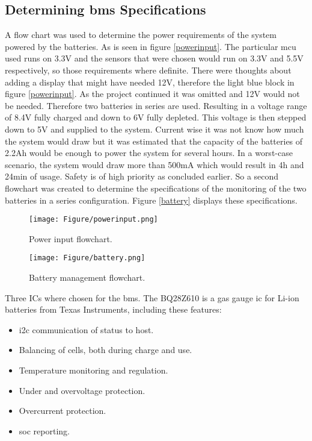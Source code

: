 \subsection{Determining \gls{bms} Specifications}

A flow chart was used to determine the power requirements of the system powered by the batteries. As is seen in figure \autoref{powerinput}. The particular \gls{mcu} used runs on 3.3V and the sensors that were chosen would run on 3.3V and 5.5V respectively, so those requirements where definite. There were thoughts about adding a display that might have needed 12V, therefore the light blue block in figure \autoref{powerinput}. As the project continued it was omitted and 12V would not be needed. Therefore two batteries in series are used. Resulting in a voltage range of 8.4V fully charged and down to 6V fully depleted. This voltage is then stepped down to 5V and supplied to the system.
Current wise it was not know how much the system would draw but it was estimated that the capacity of the batteries of 2.2Ah would be enough to power the system for several hours.
In a worst-case scenario, the system would draw more than 500mA which would result in 4h and 24min of usage.
Safety is of high priority as concluded earlier. So a second flowchart was created to determine the specifications of the monitoring of the two batteries in a series configuration. Figure \autoref{battery} displays these specifications.

\begin{figure}[H]
\centering
\texttt{[image: Figure/powerinput.png]}
\caption{Power input flowchart.}
\label{powerinput}
\end{figure}

\begin{figure}[H]
\centering
\texttt{[image: Figure/battery.png]}
\caption{Battery management flowchart.}
\label{battery}
\end{figure}


Three ICs where chosen for the \gls{bms}. The BQ28Z610 is a gas gauge \gls{ic} for Li-ion batteries from Texas Instruments, including these features:

\begin{itemize}
\item \gls{i2c} communication of status to host.
\item Balancing of cells, both during charge and use.
\item Temperature monitoring and regulation.
\item Under and overvoltage protection.
\item Overcurrent protection.
\item \gls{soc} reporting.
\end{itemize}

